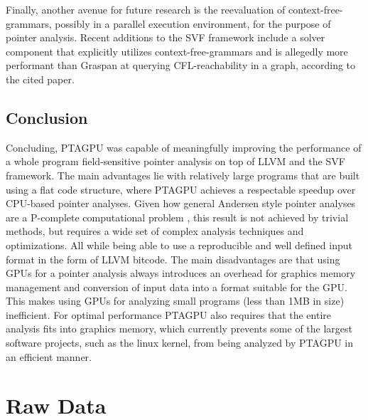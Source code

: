Finally, another avenue for future research is the reevaluation of context-free-grammars, possibly in a parallel execution environment, for the purpose of pointer analysis.
Recent additions to the SVF framework include a solver component that explicitly utilizes context-free-grammars \cite{lei2022taming} and is allegedly more performant than Graspan at querying CFL-reachability in a graph, according to the cited paper.
\section{Conclusion}
Concluding, PTAGPU was capable of meaningfully improving the performance of a whole program field-sensitive pointer analysis on top of LLVM and the SVF framework.
The main advantages lie with relatively large programs that are built using a flat code structure, where PTAGPU achieves a respectable speedup over CPU-based pointer analyses.
Given how general Andersen style pointer analyses are a P-complete computational problem \cite{mathiasen2021fine}, this result is not achieved by trivial methods, but requires a wide set of complex analysis techniques and optimizations. All while being able to use a reproducible and well defined input format in the form of LLVM bitcode.
The main disadvantages are that using GPUs for a pointer analysis always introduces an overhead for graphics memory management and conversion of input data into a format suitable for the GPU.
This makes using GPUs for analyzing small programs (less than 1MB in size) inefficient.
For optimal performance PTAGPU also requires that the entire analysis fits into graphics memory, which currently prevents some of the largest software projects, such as the linux kernel, from being analyzed by PTAGPU in an efficient manner.

\appendix

\chapter{Raw Data}

